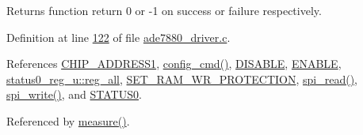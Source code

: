 \begin{DoxyReturn}{Returns}
function return 0 or -\/1 on success or failure respectively. 

 
\end{DoxyReturn}


Definition at line \hyperlink{a00035_source_l00122}{122} of file \hyperlink{a00035_source}{ade7880\-\_\-driver.\-c}.



References \hyperlink{a00037_source_l00039}{C\-H\-I\-P\-\_\-\-A\-D\-D\-R\-E\-S\-S1}, \hyperlink{a00005_ga369ee0e8379941cbc2c79b90ec3292da}{config\-\_\-cmd()}, \hyperlink{a00037_source_l00041}{D\-I\-S\-A\-B\-L\-E}, \hyperlink{a00037_source_l00040}{E\-N\-A\-B\-L\-E}, \hyperlink{a00036_source_l00219}{status0\-\_\-reg\-\_\-u\-::reg\-\_\-all}, \hyperlink{a00043_source_l00016}{S\-E\-T\-\_\-\-R\-A\-M\-\_\-\-W\-R\-\_\-\-P\-R\-O\-T\-E\-C\-T\-I\-O\-N}, \hyperlink{a00040_source_l00147}{spi\-\_\-read()}, \hyperlink{a00040_source_l00221}{spi\-\_\-write()}, and \hyperlink{a00036_source_l00216}{S\-T\-A\-T\-U\-S0}.



Referenced by \hyperlink{a00042_source_l00040}{measure()}.


